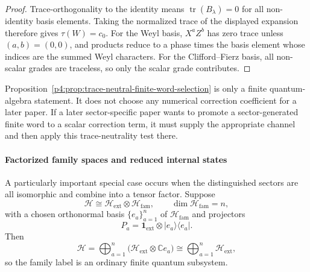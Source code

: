 \documentclass[12pt,a4paper]{article}
\begin{document}
\begin{proof}
Trace-orthogonality to the identity means \(\operatorname{tr}(B_\lambda)=0\) for all non-identity basis elements.
Taking the normalized trace of the displayed expansion therefore gives \(\tau(W)=c_0\).
For the Weyl basis, \(X^aZ^b\) has zero trace unless \((a,b)=(0,0)\), and products reduce to a phase times the basis element whose indices are the summed Weyl characters.
For the Clifford--Fierz basis, all non-scalar grades are traceless, so only the scalar grade contributes.
\end{proof}

\begin{remark}
\label{p4:rem:trace-neutral-selection-status}
\leavevmode\par\noindent
Proposition~\ref{p4:prop:trace-neutral-finite-word-selection} is only a finite
quantum-algebra statement.  It does not choose any numerical correction
coefficient for a later paper.  If a later sector-specific paper wants to
promote a sector-generated finite word to a scalar correction term, it must
supply the appropriate channel and then apply this trace-neutrality test there.
\end{remark}



\paragraph{Factorized family spaces and reduced internal states}
\label{p4:sec:part2-factorized-family-spaces}

A particularly important special case occurs when the distinguished sectors are all isomorphic and combine into a tensor factor.
Suppose
\begin{equation}
\label{p4:eq:family-factorization}
\mathcal H\cong \mathcal H_{\mathrm{ext}}\otimes \mathcal H_{\mathrm{fam}},
\qquad
\dim \mathcal H_{\mathrm{fam}}=n,
\end{equation}
with a chosen orthonormal basis $\{e_a\}_{a=1}^n$ of $\mathcal H_{\mathrm{fam}}$ and projectors
\begin{equation}
\label{p4:eq:family-projectors}
P_a=\mathbf 1_{\mathrm{ext}}\otimes |e_a\rangle\langle e_a|.
\end{equation}
Then
\begin{equation}
\label{p4:eq:family-sector-decomposition}
\mathcal H
=
\bigoplus_{a=1}^n \bigl(\mathcal H_{\mathrm{ext}}\otimes \mathbb C e_a\bigr)
\cong
\bigoplus_{a=1}^n \mathcal H_{\mathrm{ext}},
\end{equation}
so the family label is an ordinary finite quantum subsystem.
\end{document}

